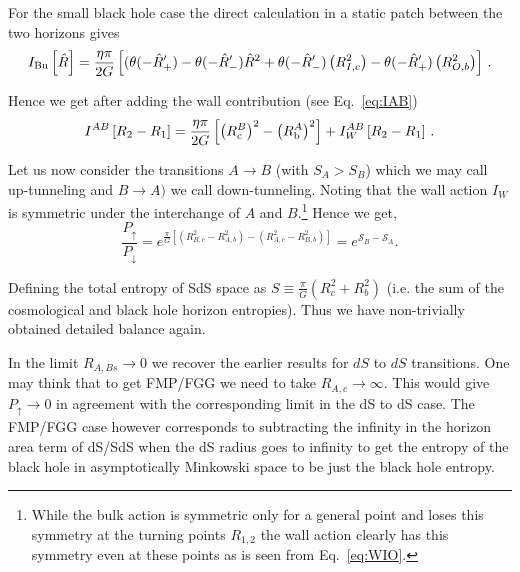 \documentclass[a4paper,11pt]{article}
\numberwithin{equation}{section}
\def\S{\mathcal S}
\numberwithin{equation}{section}
\begin{document}
For the small black hole case the direct calculation in a static patch between the two horizons gives \begin{align}
I_{{\rm {\rm Bu}}}\left[\hat{R}\right]  =\frac{\eta\pi}{2G}\left[(\theta(-\hat{R}'_{+})-\theta(-\hat{R}'_{-})\hat{R}^{2}+\theta(-\hat{R}'_{-})\left(R_{I,c}^{2}\right)-\theta(-\hat{R}'_{+})\left(R_{O,b}^{2}\right)\right]
  \,.\label{eq:Ibulk0}
\end{align}

Hence we get after adding the wall contribution
(see Eq.~\eqref{eq:IAB})
\begin{equation}
I^{AB}\left[R_{2}-R_{1}\right]=\frac{\eta\pi}{2G}\left[\left(R_{{\rm c}}^{B}\right)^{2}-\left(R_{{\rm {\rm b}}}^{A}\right)^{2}\right]+I_{W}^{AB}\left[R_{2}-R_{1}\right] \,.\label{eq:IAB}
\end{equation}

 

Let us now consider the transitions $A\rightarrow B$ (with $S_{A}>S_{B}$)
which we may call up-tunneling and $B\rightarrow A)$ we call down-tunneling. Noting that the wall action $I_{W}$ is symmetric under the interchange of  $A$ and  $B$.\footnote{While the bulk action is symmetric only for a general point and loses this symmetry at the turning points $R_{1,2}$ the wall action clearly has this symmetry even at these points as
is seen from Eq.~\eqref{eq:WIO}.} Hence  we get, 
\begin{equation}
\frac{P_{\uparrow}}{P_{\downarrow}}=e^{\frac{\pi}{G}\left[\left(R_{B,c}^{2}-R_{A,b}^{2}\right)-\left(R_{A,c}^{2}-R_{B,b}^{2}\right)\right]}=e^{\S_{B}-\S_{A}}.\label{eq:detalied balcance}
\end{equation}

Defining the total entropy of SdS space as $S\equiv \frac{\pi}{ G}(R^2_c+R^2_b)$ (i.e. the sum of the  cosmological and black hole horizon entropies).
Thus we have non-trivially obtained detailed balance again.

In the limit $R_{A,Bs}\rightarrow0$ we recover the earlier results
for $dS$ to $dS$ transitions. One may think that to get FMP/FGG
we need to take $R_{A,c}\rightarrow\infty$. This would give $P_{\uparrow}\rightarrow0$
in agreement with the corresponding limit in the dS to dS case. The
FMP/FGG case however corresponds to subtracting the infinity in the
horizon area term of dS/SdS when the dS radius goes to infinity to
get the entropy of the black hole in asymptotically Minkowski space
to be just the black hole entropy. 
\end{document}
